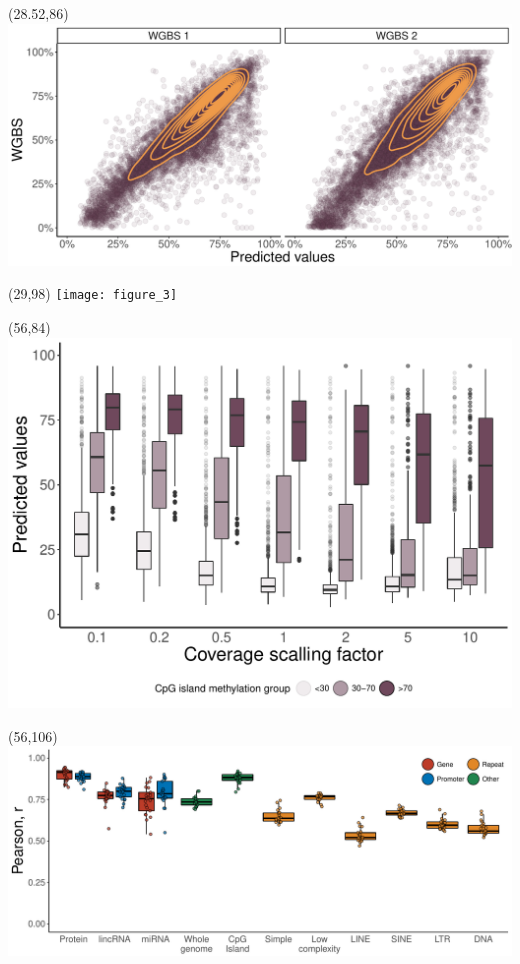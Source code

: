 \documentclass[a0,50pt]{a0poster}
\begin{document}
    \begin{textblock}{0}(28.52,86)
        \includegraphics{figure_2}
    \end{textblock}
    \begin{textblock}{0}(29,98)
        \texttt{[image: figure\_3]}
    \end{textblock}
    \begin{textblock}{0}(56,84)
        \includegraphics{figure_4}
    \end{textblock}
    \begin{textblock}{0}(56,106)
        \includegraphics{figure_5}
    \end{textblock}
\end{document}
